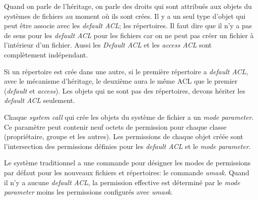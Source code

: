 Quand on parle de l'héritage, on parle des droits qui sont attribués aux objets du systèmes de fichiers au moment où ils sont crées. Il y a un seul type d'objet qui peut être associe avec les \emph{default ACL}; les répertoires. Il faut dire que il n'y a pas de sens pour les \emph{default ACL } pour les fichiers car on ne peut pas créer un fichier à l'intérieur d'un fichier. Aussi les \emph{Default ACL} et les \emph{access ACL} sont complètement indépendant.
 
Si un répertoire est crée dans une autre, si le première répertoire a \emph{default ACL}, avec le mécanisme d'héritage, le deuxième aura le même ACL que le premier (\emph{default} et \emph{access}). Les objets qui ne sont pas des répertoires, devons hériter les \emph{default ACL} seulement.
 
Chaque \emph{system call} qui crée les objets du système de fichier a un \emph{mode parameter}. Ce paramètre peut contenir neuf octets de permission pour chaque classe (propriétaire, groupe et les autres). Les permissions de chaque objet créée sont l'intersection des permissions définies pour les \emph{default ACL} et le \emph{mode parameter}.
 
Le système traditionnel a une commande pour désigner les modes de permissions par défaut pour les nouveaux fichiers et répertoires: le commande \emph{umask}. Quand il n'y a aucune \emph{default ACL}, la permission effective est déterminé par le \emph{mode parameter} moins les permissions configurés avec \emph{umask}.
 
